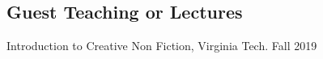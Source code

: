 \subsection{Guest Teaching or Lectures}

Introduction to Creative Non Fiction, Virginia Tech. \hfill Fall 2019 \\
